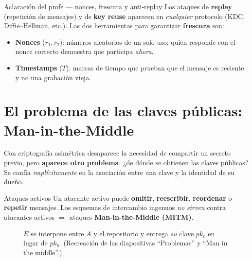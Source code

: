 \documentclass[11pt,a4paper]{article}
\begin{document}
\begin{practbox}{Aclaración del profe — nonces, frescura y anti-replay}
Los ataques de \textbf{replay} (repetición de mensajes) y de \textbf{key reuse} aparecen en
\emph{cualquier} protocolo (KDC, Diffie--Hellman, etc.). Las dos herramientas para garantizar
\textbf{frescura} son:
\begin{itemize}[leftmargin=1.4em,itemsep=1pt]
  \item \textbf{Nonces} ($r_1, r_2$): números aleatorios de un solo uso; quien responde con el
        nonce correcto demuestra que participa \emph{ahora}.
  \item \textbf{Timestamps} ($T$): marcas de tiempo que prueban que el mensaje es reciente y
        no una grabación vieja.
\end{itemize}
\end{practbox}

\section{El problema de las claves públicas: Man-in-the-Middle}

Con criptografía asimétrica desaparece la necesidad de compartir un secreto previo, pero
\textbf{aparece otro problema}: ¿de dónde se obtienen las claves públicas? Se confía
\emph{implícitamente} en la asociación entre una clave y la identidad de su dueño.

\begin{warnbox}{Ataques activos}
Un atacante activo puede \textbf{omitir}, \textbf{reescribir}, \textbf{reordenar} o
\textbf{repetir} mensajes. Los esquemas de intercambio ingenuos \emph{no sirven} contra
atacantes activos $\Rightarrow$ ataques \textbf{Man-in-the-Middle (MITM)}.
\end{warnbox}

\begin{figure}[h]
\centering
{}
\caption{$E$ se interpone entre $A$ y el repositorio y entrega \emph{su} clave $pk_e$ en lugar
de $pk_b$. (Recreación de las diapositivas ``Problemas'' y ``Man in the middle''.)}
\end{figure}
\end{document}
